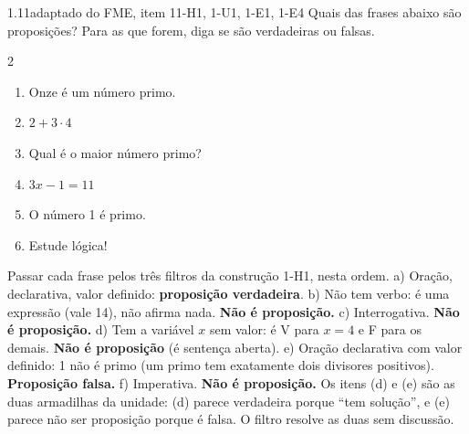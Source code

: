 \begin{exemplo}{1.1}{1}{adaptado do FME, item 1}{1-H1, 1-U1, 1-E1, 1-E4}\label{ex:1.1}
Quais das frases abaixo são proposições? Para as que forem, diga se são verdadeiras ou falsas.
\begin{multicols}{2}
\begin{enumerate}[label=\alph*)]
  \item Onze é um número primo.
  \item $2+3\cdot 4$
  \item Qual é o maior número primo?
  \item $3x-1=11$
  \item O número 1 é primo.
  \item Estude lógica!
\end{enumerate}
\end{multicols}
\plano Passar cada frase pelos três filtros da construção 1-H1, nesta ordem.
\resolucao
a) Oração, declarativa, valor definido: \textbf{proposição verdadeira}.
b) Não tem verbo: é uma expressão (vale 14), não afirma nada. \textbf{Não é proposição.}
c) Interrogativa. \textbf{Não é proposição.}
d) Tem a variável $x$ sem valor: é V para $x=4$ e F para os demais. \textbf{Não é proposição} (é sentença aberta).
e) Oração declarativa com valor definido: 1 não é primo (um primo tem exatamente dois divisores positivos). \textbf{Proposição falsa.}
f) Imperativa. \textbf{Não é proposição.}
\comentario Os itens (d) e (e) são as duas armadilhas da unidade: (d) parece verdadeira porque \enquote{tem solução}, e (e) parece não ser proposição porque é falsa. O filtro resolve as duas sem discussão.
\end{exemplo}

